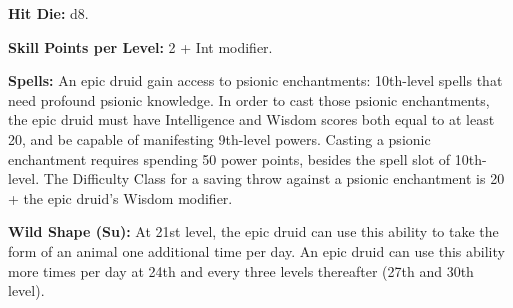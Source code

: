 

\textbf{Hit Die:} d8.

\textbf{Skill Points per Level:} 2 + Int modifier.

\textbf{Spells:} An epic druid gain access to psionic enchantments: 10th-level spells that need profound psionic knowledge. In order to cast those psionic enchantments, the epic druid must have Intelligence and Wisdom scores both equal to at least 20, and be capable of manifesting 9th-level powers. Casting a psionic enchantment requires spending 50 power points, besides the spell slot of 10th-level. The Difficulty Class for a saving throw against a psionic enchantment is 20 + the epic druid's Wisdom modifier.

\textbf{Wild Shape (Su):} At 21st level, the epic druid can use this ability to take the form of an animal one additional time per day. An epic druid can use this ability more times per day at 24th and every three levels thereafter (27th and 30th level).

